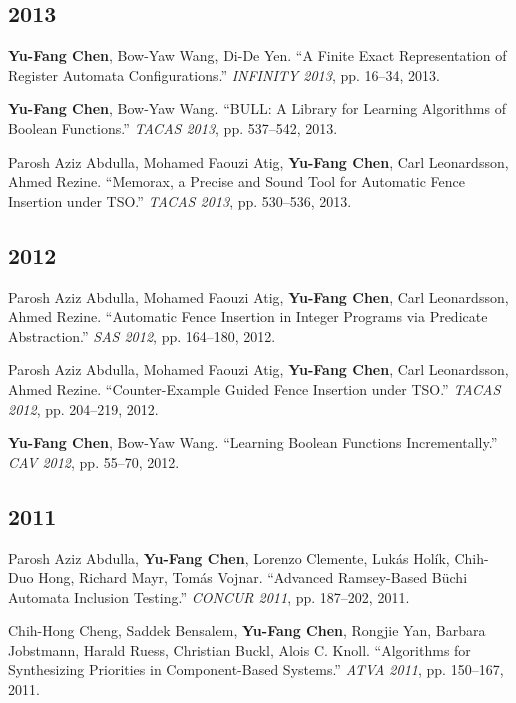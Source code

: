 \documentclass[10.5pt]{article}
\begin{document}
\subsection*{2013}
\begin{enumerate}[leftmargin=*,label={[\arabic*]},resume]
\item \textbf{Yu-Fang Chen}, Bow-Yaw Wang, Di-De Yen. ``A Finite Exact Representation of Register Automata Configurations.'' \emph{INFINITY 2013}, pp. 16--34, 2013.
\item \textbf{Yu-Fang Chen}, Bow-Yaw Wang. ``BULL: A Library for Learning Algorithms of Boolean Functions.'' \emph{TACAS 2013}, pp. 537--542, 2013.
\item Parosh Aziz Abdulla, Mohamed Faouzi Atig, \textbf{Yu-Fang Chen}, Carl Leonardsson, Ahmed Rezine. ``Memorax, a Precise and Sound Tool for Automatic Fence Insertion under TSO.'' \emph{TACAS 2013}, pp. 530--536, 2013.
\end{enumerate}
\subsection*{2012}
\begin{enumerate}[leftmargin=*,label={[\arabic*]},resume]
\item Parosh Aziz Abdulla, Mohamed Faouzi Atig, \textbf{Yu-Fang Chen}, Carl Leonardsson, Ahmed Rezine. ``Automatic Fence Insertion in Integer Programs via Predicate Abstraction.'' \emph{SAS 2012}, pp. 164--180, 2012.
\item Parosh Aziz Abdulla, Mohamed Faouzi Atig, \textbf{Yu-Fang Chen}, Carl Leonardsson, Ahmed Rezine. ``Counter-Example Guided Fence Insertion under TSO.'' \emph{TACAS 2012}, pp. 204--219, 2012.
\item \textbf{Yu-Fang Chen}, Bow-Yaw Wang. ``Learning Boolean Functions Incrementally.'' \emph{CAV 2012}, pp. 55--70, 2012.
\end{enumerate}
\subsection*{2011}
\begin{enumerate}[leftmargin=*,label={[\arabic*]},resume]
\item Parosh Aziz Abdulla, \textbf{Yu-Fang Chen}, Lorenzo Clemente, Lukás Holík, Chih-Duo Hong, Richard Mayr, Tomás Vojnar. ``Advanced Ramsey-Based Büchi Automata Inclusion Testing.'' \emph{CONCUR 2011}, pp. 187--202, 2011.
\item Chih-Hong Cheng, Saddek Bensalem, \textbf{Yu-Fang Chen}, Rongjie Yan, Barbara Jobstmann, Harald Ruess, Christian Buckl, Alois C. Knoll. ``Algorithms for Synthesizing Priorities in Component-Based Systems.'' \emph{ATVA 2011}, pp. 150--167, 2011.
\end{enumerate}
\end{document}
